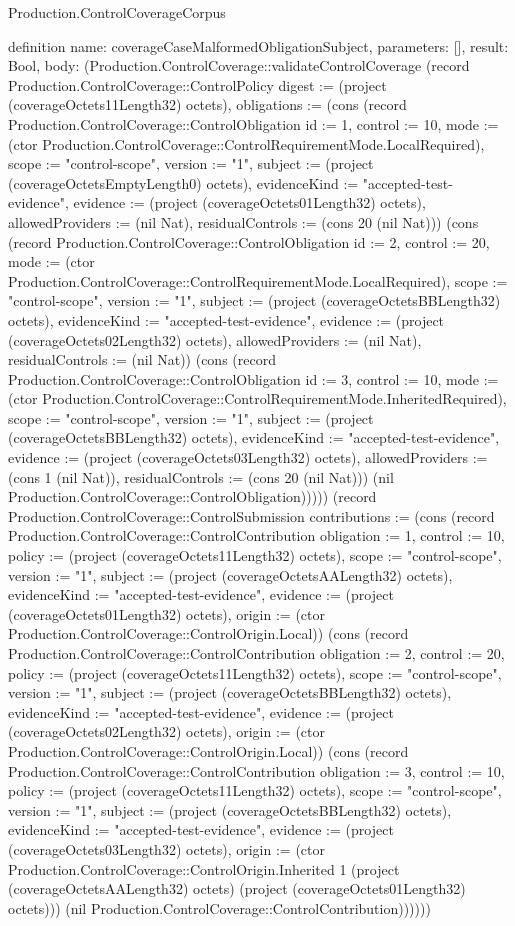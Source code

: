 \begin{lexlean}{Production.ControlCoverageCorpus}
\begin{semanticmodule}
definition{
  name: coverageCaseMalformedObligationSubject,
  parameters: [],
  result: Bool,
  body: (Production.ControlCoverage::validateControlCoverage (record Production.ControlCoverage::ControlPolicy {digest := (project (coverageOctets11Length32) octets), obligations := (cons (record Production.ControlCoverage::ControlObligation {id := 1, control := 10, mode := (ctor Production.ControlCoverage::ControlRequirementMode.LocalRequired), scope := "control-scope", version := "1", subject := (project (coverageOctetsEmptyLength0) octets), evidenceKind := "accepted-test-evidence", evidence := (project (coverageOctets01Length32) octets), allowedProviders := (nil Nat), residualControls := (cons 20 (nil Nat))}) (cons (record Production.ControlCoverage::ControlObligation {id := 2, control := 20, mode := (ctor Production.ControlCoverage::ControlRequirementMode.LocalRequired), scope := "control-scope", version := "1", subject := (project (coverageOctetsBBLength32) octets), evidenceKind := "accepted-test-evidence", evidence := (project (coverageOctets02Length32) octets), allowedProviders := (nil Nat), residualControls := (nil Nat)}) (cons (record Production.ControlCoverage::ControlObligation {id := 3, control := 10, mode := (ctor Production.ControlCoverage::ControlRequirementMode.InheritedRequired), scope := "control-scope", version := "1", subject := (project (coverageOctetsBBLength32) octets), evidenceKind := "accepted-test-evidence", evidence := (project (coverageOctets03Length32) octets), allowedProviders := (cons 1 (nil Nat)), residualControls := (cons 20 (nil Nat))}) (nil Production.ControlCoverage::ControlObligation))))}) (record Production.ControlCoverage::ControlSubmission {contributions := (cons (record Production.ControlCoverage::ControlContribution {obligation := 1, control := 10, policy := (project (coverageOctets11Length32) octets), scope := "control-scope", version := "1", subject := (project (coverageOctetsAALength32) octets), evidenceKind := "accepted-test-evidence", evidence := (project (coverageOctets01Length32) octets), origin := (ctor Production.ControlCoverage::ControlOrigin.Local)}) (cons (record Production.ControlCoverage::ControlContribution {obligation := 2, control := 20, policy := (project (coverageOctets11Length32) octets), scope := "control-scope", version := "1", subject := (project (coverageOctetsBBLength32) octets), evidenceKind := "accepted-test-evidence", evidence := (project (coverageOctets02Length32) octets), origin := (ctor Production.ControlCoverage::ControlOrigin.Local)}) (cons (record Production.ControlCoverage::ControlContribution {obligation := 3, control := 10, policy := (project (coverageOctets11Length32) octets), scope := "control-scope", version := "1", subject := (project (coverageOctetsBBLength32) octets), evidenceKind := "accepted-test-evidence", evidence := (project (coverageOctets03Length32) octets), origin := (ctor Production.ControlCoverage::ControlOrigin.Inherited 1 (project (coverageOctetsAALength32) octets) (project (coverageOctets01Length32) octets))}) (nil Production.ControlCoverage::ControlContribution))))}))
}


\end{semanticmodule}
\end{lexlean}
